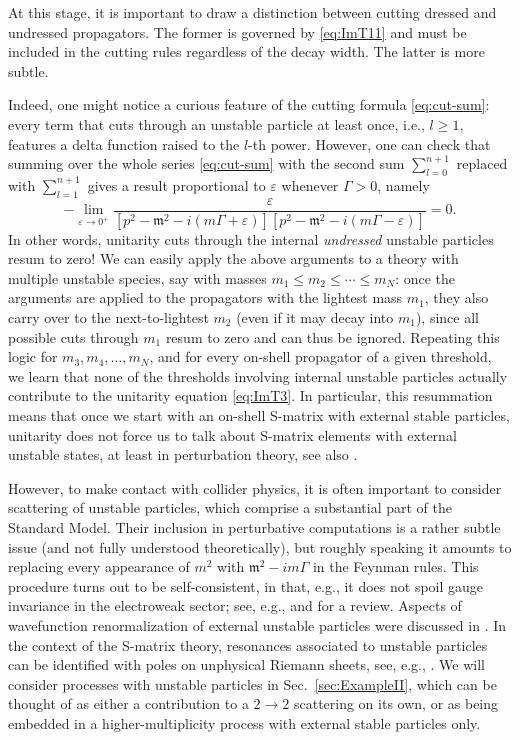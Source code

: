 \documentclass[12pt]{article}
\numberwithin{figure}{section}
\def \be {\begin{equation}}
\def \ee {\end{equation}}
\def \eps {\varepsilon}
\def \leq {\leqslant}
\def \geq {\geqslant}
\def \m {\mathfrak{m}}
\begin{document}
    At this stage, it is important to draw a distinction between cutting dressed and undressed propagators. The former is governed by \eqref{eq:ImT11} and must be included in the cutting rules regardless of the decay width. The latter is more subtle.
    
    Indeed, one might notice a curious feature of the cutting formula \eqref{eq:cut-sum}: every term that cuts through an unstable particle at least once, i.e., $l \geq 1$, features a delta function raised to the $l$-th power. However, one can check that  summing over the whole series \eqref{eq:cut-sum} with the second sum $\sum_{l=0}^{n+1}$ replaced with $\sum_{l=1}^{n+1}$ gives a result proportional to $\eps$ whenever $\Gamma>0$, namely
    \be
    -\lim_{\eps \to 0^+}\frac{\eps}{[p^2 - \m^2 - i(m\Gamma + \eps)][p^2 - \m^2 - i(m\Gamma -\eps)]} = 0.
    \ee
    In other words, unitarity cuts through the internal \emph{undressed} unstable particles resum to zero!
    We can easily apply the above arguments to a theory with multiple unstable species, say with masses $m_1 \leq m_2 \leq \cdots \leq m_N$: once the arguments are applied to the propagators with the lightest mass $m_1$, they also carry over to the next-to-lightest $m_2$ (even if it may decay into $m_1$), since all possible cuts through $m_1$ resum to zero and can thus be ignored. Repeating this logic for $m_3, m_4, \ldots, m_N$, and
    for every on-shell propagator of a given threshold, we learn that none of the thresholds involving internal unstable particles actually contribute to the unitarity equation \eqref{eq:ImT3}.
    In particular, this resummation means that once we start with an on-shell S-matrix with external stable particles, unitarity does not force us to talk about S-matrix elements with external unstable states, at least in perturbation theory, see also \cite{Veltman:1963th}.
    
    However, to make contact with collider physics, it is often important to consider scattering of unstable particles, which comprise a substantial part of the Standard Model. Their inclusion in perturbative computations is a rather subtle issue (and not fully understood theoretically), but roughly speaking it amounts to replacing every appearance of $m^2$ with $\m^2 - im\Gamma$ in the Feynman rules. This procedure turns out to be self-consistent, in that, e.g., it does not spoil gauge invariance in the electroweak sector; see, e.g., \cite{Veltman:1992tm,Denner:1997kq,Denner:2006ic,Denner:2014zga} and \cite[Sec.~6]{Denner:2019vbn} for a review. Aspects of wavefunction renormalization of external unstable particles were discussed in \cite{Kniehl:2001ch,Espriu:2002xv,Bharucha:2012nx,Collins:2019ozc}. In the context of the S-matrix theory, resonances associated to unstable particles can be identified with poles on unphysical Riemann sheets, see, e.g., \cite{Levy1959,PhysRev.119.1121,PhysRev.123.692,Landshoff1963,Olive1963b,PhysRev.131.888,Stapp1964,doi:10.1063/1.1704342,doi:10.1063/1.1704343}. We will consider processes with unstable particles in Sec.~\ref{sec:ExampleII}, which can be thought of as either a contribution to a $2 \to 2$ scattering on its own, or as being embedded in a higher-multiplicity process with external stable particles only.
	
\end{document}
